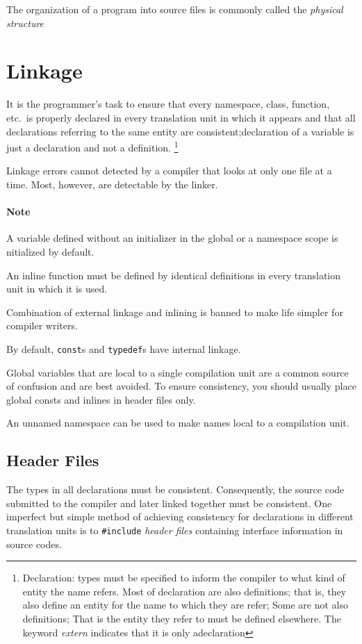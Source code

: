 \documentclass[11pt, a4paper]{book}
\begin{document}
\begin{itemize}
The organization of a program into source files is commonly called the \emph{physical structure}

\section{Linkage}It is the programmer's task to ensure that every namespace, class, function, etc.\ is properly declared in every translation unit in which it appears and that all declarations referring to the same entity are consistent;declaration of a variable is just a declaration and not a definition. \footnote{Declaration: types must be specified to inform the compiler to what kind of entity the name refers. Most of declaration are also definitions; that is, they also define an entity for the name to which they are refer; Some are not also definitions; That is the entity they refer to must be defined elsewhere.  The keyword \emph{extern} indicates that it is only adeclaration}

Linkage errors cannot detected by a compiler that looks at only one file at a time. Most, however, are detectable by the linker. 
\paragraph{Note} A variable defined without an initializer in the global or a namespace scope is nitialized by default. 

An inline function must be defined by identical definitions in every translation unit in which it is used.

Combination of external linkage and inlining is banned to make life simpler for compiler writers.

By default, \verb|const|s and \verb|typedef|s have internal linkage.

Global variables that are local to a single compilation unit are a common source of confusion and are best avoided. To ensure consistency, you should usually place global consts and inlines in header files only.

An unnamed namespace can be used to make names local to a compilation unit. 
\subsection{Header Files}
The types in all declarations must be consistent. Consequently, the source code submitted to the compiler and later linked together must be consistent. One imperfect but simple method of achieving consistency for declarations in different translation units is to \verb|#include| \emph{header files} containing interface information in source codes.


\end{itemize}
\end{document}
